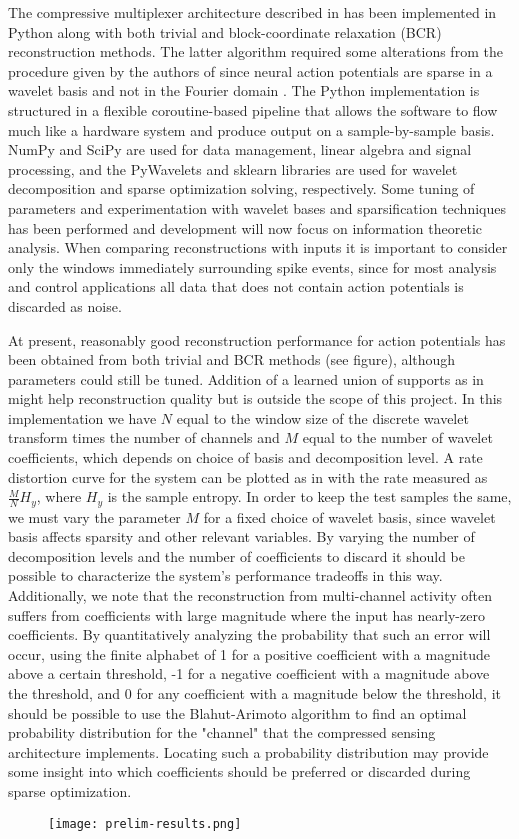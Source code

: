 \documentclass{paper}
\begin{document}
The compressive multiplexer architecture described in \cite{slavinsky2011} 
has been implemented in Python along with both trivial and block-coordinate
relaxation (BCR) \cite{sylvain2000} reconstruction methods. The latter 
algorithm required some alterations from the procedure given by the authors 
of \cite{slavinsky2011} since neural action potentials are sparse in a wavelet basis and not in the Fourier domain \cite{oweiss2006}. The Python 
implementation is structured in a flexible coroutine-based pipeline that 
allows the software to flow much like a hardware system and produce output
on a sample-by-sample basis. NumPy and SciPy are used for data management,
linear algebra and signal processing, and the PyWavelets and sklearn 
libraries are used for wavelet decomposition and sparse optimization 
solving, respectively. Some tuning of parameters and experimentation with
wavelet bases and sparsification techniques has been performed and 
development will now focus on information theoretic analysis. When comparing
reconstructions with inputs it is important to consider only the windows
immediately surrounding spike events, since for most analysis and control
applications all data that does not contain action potentials is discarded
as noise. 

At present, reasonably good reconstruction performance for action potentials
has been obtained from both trivial and BCR methods (see figure), although
parameters could still be tuned. Addition of a learned union of supports
as in \cite{charbiwala2011} might help reconstruction quality but is outside
the scope of this project. In this implementation we have $N$ equal to the 
window size of the discrete wavelet transform times the number of channels 
and $M$ equal to the number of wavelet coefficients, which depends on choice
of basis and decomposition level. A rate distortion curve for the system can
be plotted as in \cite{schulz2009} with the rate measured as 
$\frac{M}{N} H_y$, where $H_y$ is the sample entropy. In order to keep the 
test samples the same, we must vary the parameter $M$ for a fixed choice of 
wavelet basis, since wavelet basis affects sparsity and other relevant 
variables. By varying the number of decomposition levels and the number of 
coefficients to discard it should be possible to characterize the system's 
performance tradeoffs in this way. Additionally, we note that the 
reconstruction from multi-channel activity often suffers from coefficients 
with large magnitude where the input has nearly-zero coefficients. By 
quantitatively analyzing the probability that such an error will occur, 
using the finite alphabet of 1 for a positive coefficient with a magnitude 
above a certain threshold, -1 for a negative coefficient with a magnitude 
above the threshold, and 0 for any coefficient with a magnitude below the 
threshold, it should be possible to use the Blahut-Arimoto algorithm to find
an optimal probability distribution for the "channel" that the compressed 
sensing architecture implements. Locating such a probability distribution 
may provide some insight into which coefficients should be preferred or 
discarded during sparse optimization.

\begin{figure}
  \texttt{[image: prelim-results.png]}
\end{figure}



\end{document}
